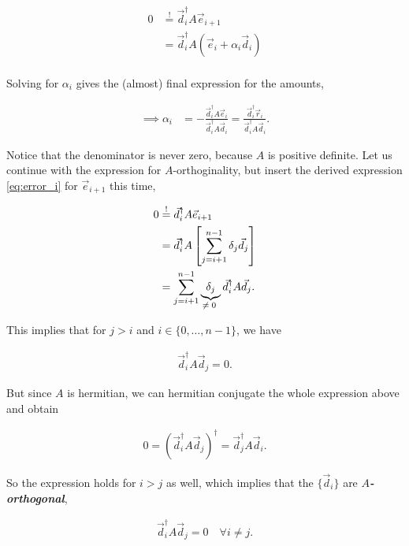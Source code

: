 \documentclass{article}
\theoremstyle{plain} %
\theoremstyle{remark} %
\def\df#1{\textbf{\textit{#1}}}
\numberwithin{equation}{section}
\begin{document}
\begin{align*}
    0 &\stackrel{!}{=} \vec{d}_i^{\dagger} A \vec{e}_{i+1} \\
                    &= \vec{d}_i^{\dagger} A ( \vec{e}_{i} + \alpha_i \vec{d}_i ) \\
\end{align*}

Solving for $\alpha_i$ gives the (almost) final expression for the amounts,

\begin{align}
      \implies         \alpha_i &= - \frac{ \vec{d}_i^{\dagger} A \vec{e}_{i} }{ \vec{d}_i^{\dagger} A \vec{d}_i } = \frac{ \vec{d}_i^{\dagger} \vec{r}_{i} }{ \vec{d}_i^{\dagger} A \vec{d}_i }. \label{eq:alphas_pre}
\end{align}

Notice that the denominator is never zero, because $A$ is positive definite. Let us continue with the expression for $A$-orthoginality, but insert the derived expression \eqref{eq:error_i} for $\vec{e}_{i+1}$ this time,

\begin{align*}
    0 &\stackrel{!}{=} \vec{d}_i^{\dagger} A \vec{e}_{i+1} \\
                    &= \vec{d}_i^{\dagger} A \left[ \sum_{j=i+1}^{n-1} \delta_j \vec{d}_j \right] \\
                    &= \sum_{j=i+1}^{n-1} \underbrace{ \delta_j }_{\text{\makebox[0pt]{$\neq 0$} }} \vec{d}_i^{\dagger} A \vec{d}_j.
\end{align*}

This implies that for $j>i$ and $i \in \{0, \dots, n-1\}$, we have

\begin{align*}
    \vec{d}_i^{\dagger} A \vec{d}_j = 0.
\end{align*}

But since $A$ is hermitian, we can hermitian conjugate the whole expression above and obtain

\begin{align*}
    0 = \left( \vec{d}_i^{\dagger} A \vec{d}_j \right)^{\dagger} = \vec{d}_j^{\dagger} A \vec{d}_i.
\end{align*}

So the expression holds for $i>j$ as well, which implies that the $\{\vec{d}_i\}$ are \df{$A$-orthogonal},

\begin{align*}
    \vec{d}_i^{\dagger} A \vec{d}_j = 0 \quad \forall i \neq j.
\end{align*}
\end{document}
